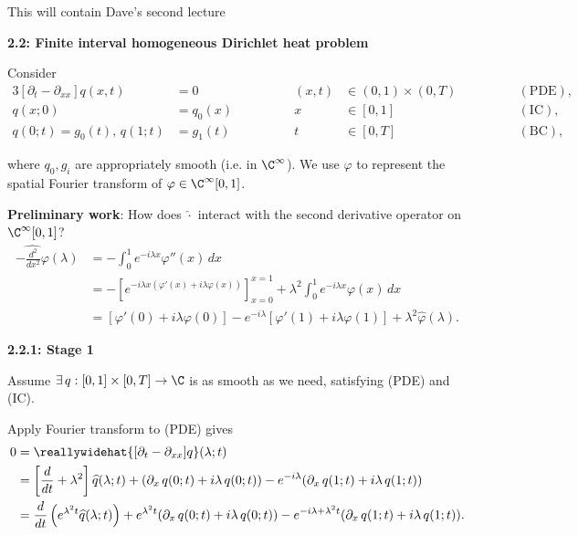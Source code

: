 This will contain Dave's second lecture


{\Large \bf 2.2: Finite interval homogeneous Dirichlet heat problem}

\bigskip
\bigskip

Consider
\begin{alignat*}{3}  
    [\partial_t - \partial_{xx}]q(x,t) &= 0 & \qquad \qquad (x,t) &\in (0,1) \times (0,T) & \qquad \qquad (\text{PDE}),\\
    q(x;0) &= q_0(x) &\qquad \qquad x &\in [0,1]  & \qquad \qquad (\text{IC}),\\
    q(0;t) = g_0(t),\, q(1;t) &= g_1(t) &\qquad \qquad t &\in [0,T] & \qquad \qquad (\text{BC}),
\end{alignat*}

where $q_0, g_i$ are appropriately smooth (i.e. in $\C^\infty$). We use $\widehat{\varphi}$ to represent the spatial Fourier transform of $\varphi \in \C^\infty[0,1]$.

\bigskip

\textbf{Preliminary work}: How does $\widehat{\cdot}$ interact with the second derivative operator on $\C^\infty[0,1]$?
\begin{align*}
    \widehat{-\frac{d^2}{dx^2}\varphi}(\lambda) &= -\int_0^1e^{-i\lambda x}\varphi''(x)\,dx\\ &= -\left[e^{-i\lambda x(\varphi'(x) + i\lambda\varphi(x))}\right]_{x = 0}^{x=1} + \lambda^2\int_0^1e^{-i\lambda x}\varphi(x)\,dx\\
    &= \left[\varphi'(0) + i\lambda\varphi(0)\right] - e^{-i\lambda}\left[\varphi'(1) + i\lambda\varphi(1)\right] + \lambda^2\widehat{\varphi}(\lambda).
\end{align*}

\bigskip

{\large \bf 2.2.1: Stage 1}

\bigskip

Assume $\exists\, q: [0,1]\times[0,T] \to \C$ is as smooth as we need, satisfying (PDE) and (IC).

Apply Fourier transform to (PDE) gives
\begin{align*}
    0 &= \reallywidehat{[\partial_t - \partial_{xx}]q}(\lambda;t)\\ &= \left[\frac{d}{dt}+\lambda^2\right] \widehat{q}(\lambda;t) + (\partial_x\,q(0;t) + i\lambda\,q(0;t)) - e^{-i\lambda}(\partial_x\,q(1;t) + i\lambda\,q(1;t))\\
    &= \frac{d}{dt}\left(e^{\lambda^2 t}\widehat{q}(\lambda;t)\right) + e^{\lambda^2t}(\partial_x\,q(0;t) + i\lambda\,q(0;t)) - e^{-i\lambda + \lambda^2t}(\partial_x\,q(1;t) + i\lambda\,q(1;t)).
\end{align*}

